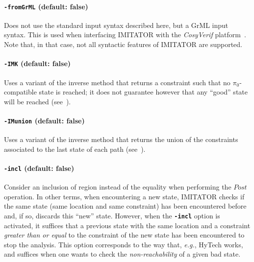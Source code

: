 \documentclass[a4paper,11pt]{report}
\newcommand{\pio}{\pi_0}
\newcommand{\CosyVerif}{\emph{CosyVerif}}
\newcommand{\hytech}{{\sc HyTech}}
\newcommand{\imitator}{\textsf{IMITATOR}}
\newcommand{\code}[1]{\textbf{\texttt{#1}}}
\newcommand{\styleOption}[1]{\textcolor{optioncolor}{\texttt{#1}}}
\newcommand{\eg}{\textcolor{colorok}{\textit{e.g.}, }}
\begin{document}
\paragraph{\styleOption{-fromGrML} (default: false)}

Does not use the standard input syntax described here, but a GrML input syntax.
This is used when interfacing \imitator{} with the \CosyVerif{} platform~\cite{AHHKLLP13}.
Note that, in that case, not all syntactic features of \imitator{} are supported.



\paragraph{\styleOption{-IMK} (default: false)}
Uses a variant of the inverse method that returns a constraint such that no $\pio$-compatible state is reached; it does not guarantee however that any ``good'' state will be reached (see~\cite{AS13}).



\paragraph{\styleOption{-IMunion} (default: false)}
Uses a variant of the inverse method that returns the union of the constraints associated to the last state of each path (see~\cite{AS13}).


\paragraph{\styleOption{-incl} (default: false)}
Consider an inclusion of region instead of the equality when performing the $\textit{Post}$ operation.
In other terms, when encountering a new state, \imitator{} checks if the same state (same location and same constraint) has been encountered before and, if so, discards this ``new'' state.
However, when the \code{-incl} option is activated, it suffices that a previous state with the same location and a constraint \emph{greater than or equal} to the constraint of the new state has been encountered to stop the analysis.
This option corresponds to the way that, \eg{} \hytech{} works, and suffices when one wants to check the \emph{non-reachability} of a given bad state.
\end{document}
